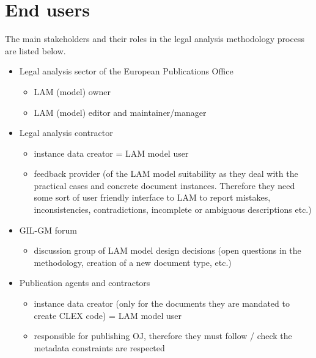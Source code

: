 \hypertarget{ariaid-title1}{%
\section{End users}\label{ariaid-title1}}

The main stakeholders and their roles in the legal analysis methodology
process are listed below.

\begin{itemize}
\tightlist
\item
  Legal analysis sector of the European Publications Office

  \begin{itemize}
  \tightlist
  \item
    LAM (model) owner
  \item
    LAM (model) editor and maintainer/manager
  \end{itemize}
\item
  Legal analysis contractor

  \begin{itemize}
  \tightlist
  \item
    instance data creator = LAM model user
  \item
    feedback provider (of the LAM model suitability as they deal with
    the practical cases and concrete document instances. Therefore they
    need some sort of user friendly interface to LAM to report mistakes,
    inconsistencies, contradictions, incomplete or ambiguous
    descriptions etc.)
  \end{itemize}
\item
  GIL-GM forum

  \begin{itemize}
  \tightlist
  \item
    discussion group of LAM model design decisions (open questions in
    the methodology, creation of a new document type, etc.)
  \end{itemize}
\item
  Publication agents and contractors

  \begin{itemize}
  \tightlist
  \item
    instance data creator (only for the documents they are mandated to
    create CLEX code) = LAM model user
  \item
    responsible for publishing OJ, therefore they must follow / check
    the metadata constraints are respected
  \end{itemize}
\end{itemize}
